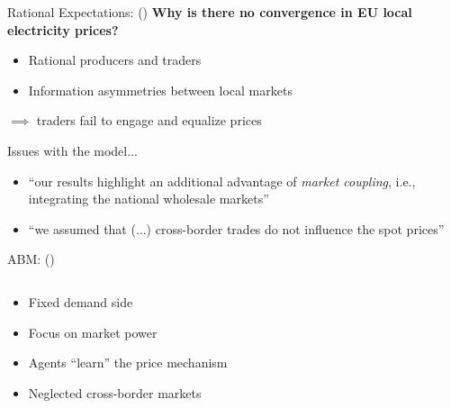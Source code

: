 \documentclass{beamer}
\begin{document}
\begin{frame}{Rational Expectations: \citeauthor{Gebhardt2013} (\citeyear{Gebhardt2013})}
    \textbf{Why is there no convergence in EU local electricity prices?}

    \begin{itemize} \setlength\itemsep{1.5em}
              \pause \item Rational producers and traders
              \pause \item Information asymmetries between local markets \pause
    \end{itemize}

    $\implies$ traders fail to engage and equalize prices

    Issues with the model...

    \begin{itemize} \setlength\itemsep{1.5em}
        \item ``our results highlight an additional advantage of \textit{market coupling}, i.e., integrating the national wholesale markets''
        \item ``we assumed that (...) cross-border trades do not influence the spot prices''
    \end{itemize}

\end{frame}

\begin{frame}{ABM: \citeauthor{Weidlich2008} (\citeyear{Weidlich2008})}

    \begin{columns}[T,onlytextwidth]

        \begin{column}{.4\textwidth}
            \begin{itemize} \setlength\itemsep{1.5em}
                \item Fixed demand side \pause
                \item Focus on market power \pause
                \item Agents ``learn'' the price mechanism \pause
                \item Neglected cross-border markets
            \end{itemize}
        \end{column}

        \hfill

        \begin{column}{.6\textwidth}
            \centering
            \resizebox{0.7\textwidth}{!}{}
        \end{column}
    \end{columns}

\end{frame}
\end{document}
